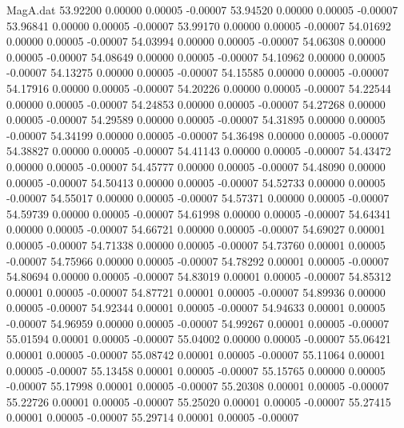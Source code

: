 \begin{filecontents}{MagA.dat}
  53.92200    0.00000    0.00005   -0.00007
  53.94520    0.00000    0.00005   -0.00007
  53.96841    0.00000    0.00005   -0.00007
  53.99170    0.00000    0.00005   -0.00007
  54.01692    0.00000    0.00005   -0.00007
  54.03994    0.00000    0.00005   -0.00007
  54.06308    0.00000    0.00005   -0.00007
  54.08649    0.00000    0.00005   -0.00007
  54.10962    0.00000    0.00005   -0.00007
  54.13275    0.00000    0.00005   -0.00007
  54.15585    0.00000    0.00005   -0.00007
  54.17916    0.00000    0.00005   -0.00007
  54.20226    0.00000    0.00005   -0.00007
  54.22544    0.00000    0.00005   -0.00007
  54.24853    0.00000    0.00005   -0.00007
  54.27268    0.00000    0.00005   -0.00007
  54.29589    0.00000    0.00005   -0.00007
  54.31895    0.00000    0.00005   -0.00007
  54.34199    0.00000    0.00005   -0.00007
  54.36498    0.00000    0.00005   -0.00007
  54.38827    0.00000    0.00005   -0.00007
  54.41143    0.00000    0.00005   -0.00007
  54.43472    0.00000    0.00005   -0.00007
  54.45777    0.00000    0.00005   -0.00007
  54.48090    0.00000    0.00005   -0.00007
  54.50413    0.00000    0.00005   -0.00007
  54.52733    0.00000    0.00005   -0.00007
  54.55017    0.00000    0.00005   -0.00007
  54.57371    0.00000    0.00005   -0.00007
  54.59739    0.00000    0.00005   -0.00007
  54.61998    0.00000    0.00005   -0.00007
  54.64341    0.00000    0.00005   -0.00007
  54.66721    0.00000    0.00005   -0.00007
  54.69027    0.00001    0.00005   -0.00007
  54.71338    0.00000    0.00005   -0.00007
  54.73760    0.00001    0.00005   -0.00007
  54.75966    0.00000    0.00005   -0.00007
  54.78292    0.00001    0.00005   -0.00007
  54.80694    0.00000    0.00005   -0.00007
  54.83019    0.00001    0.00005   -0.00007
  54.85312    0.00001    0.00005   -0.00007
  54.87721    0.00001    0.00005   -0.00007
  54.89936    0.00000    0.00005   -0.00007
  54.92344    0.00001    0.00005   -0.00007
  54.94633    0.00001    0.00005   -0.00007
  54.96959    0.00000    0.00005   -0.00007
  54.99267    0.00001    0.00005   -0.00007
  55.01594    0.00001    0.00005   -0.00007
  55.04002    0.00000    0.00005   -0.00007
  55.06421    0.00001    0.00005   -0.00007
  55.08742    0.00001    0.00005   -0.00007
  55.11064    0.00001    0.00005   -0.00007
  55.13458    0.00001    0.00005   -0.00007
  55.15765    0.00000    0.00005   -0.00007
  55.17998    0.00001    0.00005   -0.00007
  55.20308    0.00001    0.00005   -0.00007
  55.22726    0.00001    0.00005   -0.00007
  55.25020    0.00001    0.00005   -0.00007
  55.27415    0.00001    0.00005   -0.00007
  55.29714    0.00001    0.00005   -0.00007

\end{filecontents}
